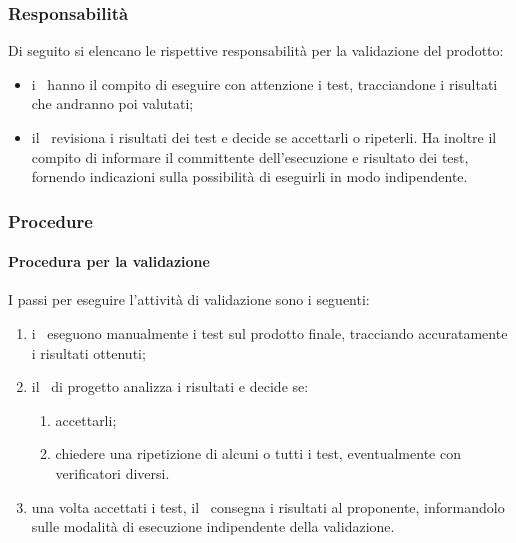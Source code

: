 \documentclass[../NormeProgetto.tex]{subfiles}
\begin{document}
		\subsubsection{Responsabilità}
			Di seguito si elencano le rispettive responsabilità per la validazione del prodotto: 
			\begin{itemize}
				\item i \verificatori\ hanno il compito di eseguire con attenzione i test, tracciandone i risultati che andranno poi valutati;
				\item il \responsabilediprogetto\ revisiona i risultati dei test e decide se accettarli o ripeterli. Ha inoltre il compito di informare il committente dell'esecuzione e risultato dei test, fornendo indicazioni sulla possibilità di eseguirli in modo indipendente.
			\end{itemize}
			\subsubsection{Procedure}
				\paragraph{Procedura per la validazione}
					I passi per eseguire l'attività di validazione sono i seguenti:
					\begin{enumerate}
						\item i \verificatori\ eseguono manualmente i test sul prodotto finale, tracciando accuratamente i risultati ottenuti;
						\item il \responsabilediprogetto\ di progetto analizza i risultati e decide se:
							\begin{enumerate}
							 	\item accettarli;
							 	\item chiedere una ripetizione di alcuni o tutti i test, eventualmente con verificatori diversi.
							 \end{enumerate}  
						\item una volta accettati i test, il \responsabilediprogetto\ consegna i risultati al proponente, informandolo sulle modalità di esecuzione indipendente della validazione.
					\end{enumerate}
\end{document}

